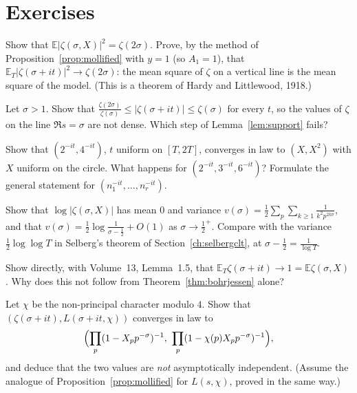 \section{Exercises}

\begin{exercise}[$\star$]\label{ex:meansquarezeta}
Show that $\mathbb E|\zeta(\sigma,X)|^2=\zeta(2\sigma)$. Prove, by the method of Proposition~\ref{prop:mollified} with $y=1$ (so $A_1=1$), that $\mathbb E_T|\zeta(\sigma+it)|^2\to\zeta(2\sigma)$: the mean square of $\zeta$ on a vertical line is the mean square of the model. (This is a theorem of Hardy and Littlewood, 1918.)
\end{exercise}

\begin{exercise}[$\star$]\label{ex:sigmabig}
Let $\sigma>1$. Show that $\frac{\zeta(2\sigma)}{\zeta(\sigma)}\le|\zeta(\sigma+it)|\le\zeta(\sigma)$ for every $t$, so the values of $\zeta$ on the line $\Re s=\sigma$ are not dense. Which step of Lemma~\ref{lem:support} fails?
\end{exercise}

\begin{exercise}[$\star\star$]\label{ex:kwfail}
Show that $(2^{-it},4^{-it})$, $t$ uniform on $[T,2T]$, converges in law to $(X,X^2)$ with $X$ uniform on the circle. What happens for $(2^{-it},3^{-it},6^{-it})$? Formulate the general statement for $(n_1^{-it},\dots,n_r^{-it})$.
\end{exercise}

\begin{exercise}[$\star\star$]\label{ex:varbj}
Show that $\log|\zeta(\sigma,X)|$ has mean $0$ and variance $v(\sigma)=\frac12\sum_p\sum_{k\ge1}\frac1{k^2p^{2k\sigma}}$, and that $v(\sigma)=\frac12\log\frac1{\sigma-\frac12}+O(1)$ as $\sigma\to\frac12^+$. Compare with the variance $\frac12\log\log T$ in Selberg's theorem of Section~\ref{ch:selbergclt}, at $\sigma-\frac12=\frac1{\log T}$.
\end{exercise}

\begin{exercise}[$\star\star$]\label{ex:meanzeta}
Show directly, with Volume~13, Lemma~1.5, that $\mathbb E_T\zeta(\sigma+it)\to1=\mathbb E\zeta(\sigma,X)$. Why does this not follow from Theorem~\ref{thm:bohrjessen} alone?
\end{exercise}

\begin{exercise}[$\star\star\star$]\label{ex:jointbj}
Let $\chi$ be the non-principal character modulo $4$. Show that $(\zeta(\sigma+it),L(\sigma+it,\chi))$ converges in law to
\[
\Bigl(\prod_p(1-X_pp^{-\sigma})^{-1},\ \prod_p(1-\chi(p)X_pp^{-\sigma})^{-1}\Bigr),
\]
and deduce that the two values are \emph{not} asymptotically independent. (Assume the analogue of Proposition~\ref{prop:mollified} for $L(s,\chi)$, proved in the same way.)
\end{exercise}


